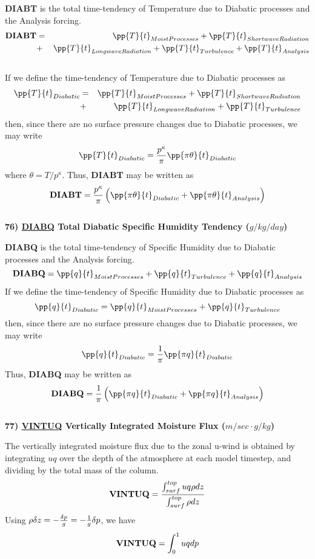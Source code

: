 \noindent
{\bf DIABT} is the total time-tendency of Temperature due to Diabatic processes
and the Analysis forcing.
\begin{eqnarray*}
{\bf DIABT} & = & \pp{T}{t}_{Moist Processes} + \pp{T}{t}_{Shortwave Radiation} \\
           & + & \pp{T}{t}_{Longwave Radiation} + \pp{T}{t}_{Turbulence} + \pp{T}{t}_{Analysis} 
\end{eqnarray*}
\\
If we define the time-tendency of Temperature due to Diabatic processes as
\begin{eqnarray*}
\pp{T}{t}_{Diabatic} & = & \pp{T}{t}_{Moist Processes} + \pp{T}{t}_{Shortwave Radiation} \\
                     & + & \pp{T}{t}_{Longwave Radiation} + \pp{T}{t}_{Turbulence}
\end{eqnarray*}
then, since there are no surface pressure changes due to Diabatic processes, we may write
\[
\pp{T}{t}_{Diabatic} = {p^\kappa \over \pi }\pp{\pi \theta}{t}_{Diabatic}
\]
where $\theta = T/p^\kappa$.  Thus, {\bf DIABT} may be written as
\[
{\bf DIABT} = {p^\kappa \over \pi } \left( \pp{\pi \theta}{t}_{Diabatic} + \pp{\pi \theta}{t}_{Analysis} \right)
\]
\\

\noindent
{\bf 76)  \underline {DIABQ} Total Diabatic Specific Humidity Tendency  ($g/kg/day$) }

\noindent
{\bf DIABQ} is the total time-tendency of Specific Humidity due to Diabatic processes
and the Analysis forcing.
\[
{\bf DIABQ} = \pp{q}{t}_{Moist Processes} + \pp{q}{t}_{Turbulence} + \pp{q}{t}_{Analysis} 
\]
If we define the time-tendency of Specific Humidity due to Diabatic processes as
\[
\pp{q}{t}_{Diabatic} = \pp{q}{t}_{Moist Processes} + \pp{q}{t}_{Turbulence}
\]
then, since there are no surface pressure changes due to Diabatic processes, we may write
\[
\pp{q}{t}_{Diabatic} = {1 \over \pi }\pp{\pi q}{t}_{Diabatic}
\]
Thus, {\bf DIABQ} may be written as
\[
{\bf DIABQ} = {1 \over \pi } \left( \pp{\pi q}{t}_{Diabatic} + \pp{\pi q}{t}_{Analysis} \right)
\]
\\

\noindent
{\bf 77)  \underline {VINTUQ} Vertically Integrated Moisture Flux ($m/sec \cdot g/kg$) }

\noindent
The vertically integrated moisture flux due to the zonal u-wind is obtained by integrating
$u q$ over the depth of the atmosphere at each model timestep, 
and dividing by the total mass of the column.
\[
{\bf VINTUQ} = \frac{ \int_{surf}^{top} u q \rho dz  } { \int_{surf}^{top} \rho dz  }
\]
Using $\rho \delta z = -{\delta p \over g} = - {1 \over g} \delta p$, we have 
\[
{\bf VINTUQ} = { \int_0^1 u q dp  }
\]
\\


